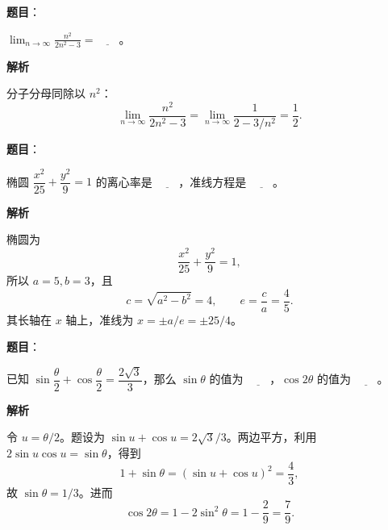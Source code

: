 \begin{answer}

\textbf{题目}：

$\displaystyle\lim_{n\to\infty}\frac{n^2}{2n^2-3}=\underline{\qquad}$。

\textbf{解析}

分子分母同除以 $n^2$：
\nopagebreak[4]
\[
\lim_{n\to\infty}\frac{n^2}{2n^2-3}
=\lim_{n\to\infty}\frac1{2-3/n^2}=\frac12.
\]


\end{answer}
\begin{answer}

\textbf{题目}：

椭圆 $\dfrac{x^2}{25}+\dfrac{y^2}{9}=1$ 的离心率是 $\underline{\qquad}$，准线方程是 $\underline{\qquad}$。

\textbf{解析}

椭圆为
\nopagebreak[4]
\[
\frac{x^2}{25}+\frac{y^2}{9}=1,
\]
所以 $a=5,b=3$，且
\nopagebreak[4]
\[
c=\sqrt{a^2-b^2}=4,\qquad e=\frac ca=\frac45.
\]
其长轴在 $x$ 轴上，准线为 $x=\pm a/e=\pm25/4$。


\end{answer}
\begin{answer}

\textbf{题目}：

已知 $\sin\dfrac{\theta}{2}+\cos\dfrac{\theta}{2}=\dfrac{2\sqrt{3}}{3}$，那么 $\sin\theta$ 的值为 $\underline{\qquad}$，$\cos 2\theta$ 的值为 $\underline{\qquad}$。

\textbf{解析}

令 $u=\theta/2$。题设为 $\sin u+\cos u=2\sqrt3/3$。两边平方，利用 $2\sin u\cos u=\sin\theta$，得到
\nopagebreak[4]
\[
1+\sin\theta=\left(\sin u+\cos u\right)^2=\frac43,
\]
故 $\sin\theta=1/3$。进而
\nopagebreak[4]
\[
\cos2\theta=1-2\sin^2\theta=1-\frac29=\frac79.
\]


\end{answer}
